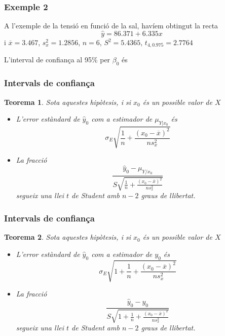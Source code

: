 \documentclass[12pt,t]{beamer}
\theoremstyle{plain}
\newtheorem{teorema}{Teorema}
\theoremstyle{definition}
\begin{document}
\begin{frame}
\frametitle{Exemple 2}
\vspace*{-2ex}

A l'exemple de la tensió en funció de la sal, havíem obtingut la recta
$$
\widehat{y}=86.371+6.335x
$$
i $\overline{x}=3.467$, $s_x^2=1.2856$, $n=6$, $S^2=5.4365$, $t_{4,0.975}=2.7764$
\medskip

L'interval de confiança al 95\% per $\beta_0$ és
\end{frame}




\begin{frame}
\frametitle{Intervals de confiança}
\begin{teorema}
Sota aquestes hipòtesis, i si $x_0$ és un possible valor de $X$
\begin{itemize}
\item L'error estàndard de $\widehat{y}_0$ com a estimador de $\mu_{Y|x_0}$ és
$$
\sigma_E\sqrt{\frac{1}{n}+\frac{(x_0-\overline{x})^2}{ns^2_x}}
$$

\item La fracció
$$
\frac{\widehat{y}_0-\mu_{Y/x_0}}{S\sqrt{\frac{1}{n}+\frac{(x_0-\overline{x})^2}{n
s^2_x}}}$$
segueix una llei $t$ de Student amb $n-2$ graus de llibertat.
\end{itemize}
\end{teorema}
\end{frame}


\begin{frame}
\frametitle{Intervals de confiança}
\begin{teorema}
Sota aquestes hipòtesis, i si $x_0$ és un possible valor de $X$
\begin{itemize}
\item L'error estàndard de $\widehat{y}_0$ com a estimador de $y_0$ és
$$
\sigma_E\sqrt{1+\frac{1}{n}+\frac{(x_0-\overline{x})^2}{ns^2_x}}
$$

\item La fracció
$$
\frac{\widehat{y}_0-y_0}{S\sqrt{1+\frac{1}{n}+\frac{(x_0-\overline{x})^2}{n
s^2_x}}}
$$
segueix una llei $t$ de Student amb $n-2$ graus de llibertat.
\end{itemize}
\end{teorema}
\end{frame}
\end{document}
